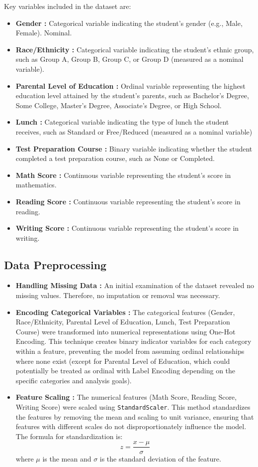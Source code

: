 \documentclass[a4paper,12pt]{article}
\begin{document}
	Key variables included in the dataset are:
	\begin{itemize}
		\item\textbf { Gender : }Categorical variable indicating the student's gender (e.g., Male, Female). Nominal.
	\item\textbf { Race/Ethnicity : }Categorical variable indicating the student’s ethnic group, such as Group A, Group B, Group C, or Group D (measured as a nominal variable).
		\item\textbf { Parental Level of Education : }Ordinal variable representing the highest education level attained by the student’s parents, such as Bachelor's Degree, Some College, Master's Degree, Associate's Degree, or High School.
	\item\textbf { Lunch : }Categorical variable indicating the type of lunch the student receives, such as Standard or Free/Reduced (measured as a nominal variable)
		\item\textbf { Test Preparation Course : }Binary variable indicating whether the student completed a test preparation course, such as None or Completed.
	\item\textbf { Math Score : }Continuous variable representing the student’s score in mathematics.
		\item\textbf { Reading Score : }Continuous variable representing the student’s score in reading.
	\item\textbf { Writing Score : }Continuous variable representing the student’s score in writing.
		\end{itemize}


	\subsection{Data Preprocessing}
		\begin{itemize}
	\item\textbf { Handling Missing Data : } An initial examination of the dataset revealed no missing values. Therefore, no imputation or removal was necessary.
			\item\textbf {Encoding Categorical Variables : } The categorical features (Gender, Race/Ethnicity, Parental Level of Education, Lunch, Test Preparation Course) were transformed into numerical representations using One-Hot Encoding. This technique creates binary indicator variables for each category within a feature, preventing the model from assuming ordinal relationships where none exist (except for Parental Level of Education, which could potentially be treated as ordinal with Label Encoding depending on the specific categories and analysis goals).
	\item\textbf {Feature Scaling : } The numerical features (Math Score, Reading Score, Writing Score) were scaled using \texttt{StandardScaler}. This method standardizes the features by removing the mean and scaling to unit variance, ensuring that features with different scales do not disproportionately influence the model. The formula for standardization is:
	\[z = \frac{x - \mu}{\sigma}\]
	where \( \mu \) is the mean and \( \sigma \) is the standard deviation of the feature.
	\end{itemize}
\end{document}
